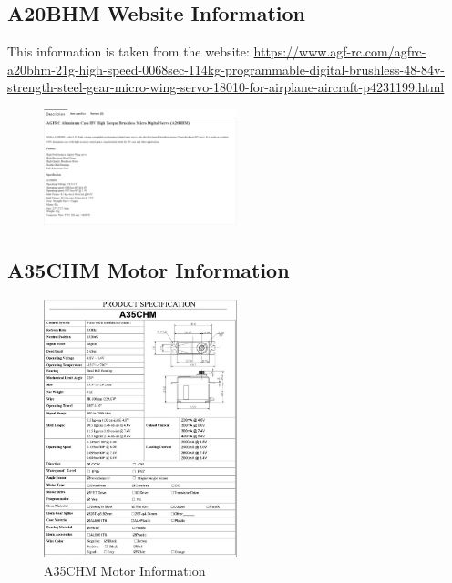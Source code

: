 \subsection{A20BHM Website Information}
\label{appendix:A20_info}

This information is taken from the website: \url{https://www.agf-rc.com/agfrc-a20bhm-21g-high-speed-0068sec-114kg-programmable-digital-brushless-48-84v-strength-steel-gear-micro-wing-servo-18010-for-airplane-aircraft-p4231199.html}
\begin{figure}[H]
    \centering
    \includegraphics[width=0.5\textwidth]{Images/A20_info.png}
    \label{fig:A20_info}
\end{figure}

\subsection{A35CHM Motor Information}
\label{appendix:A35CHM_motor_info}

\begin{figure}[H]
    \centering
    \includegraphics[width=0.5\textwidth]{Images/A35CHM_info.png}
    \caption{A35CHM Motor Information}
    \label{fig:A35CHM_info}
\end{figure}

